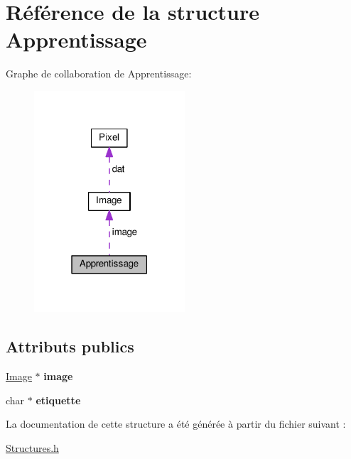 \hypertarget{structApprentissage}{}\section{Référence de la structure Apprentissage}
\label{structApprentissage}


Graphe de collaboration de Apprentissage\+:
\nopagebreak
\begin{figure}[H]
\begin{center}
\leavevmode
\includegraphics[width=159pt]{structApprentissage__coll__graph}
\end{center}
\end{figure}
\subsection*{Attributs publics}
\begin{DoxyCompactItemize}
\item 
\hyperlink{structImage}{Image} $\ast$ {\bfseries image}\hypertarget{structApprentissage_af3defb9d6e44f5ca0fe145113cec1943}{}\label{structApprentissage_af3defb9d6e44f5ca0fe145113cec1943}

\item 
char $\ast$ {\bfseries etiquette}\hypertarget{structApprentissage_af1668167b1678d621bb9b88573f55be7}{}\label{structApprentissage_af1668167b1678d621bb9b88573f55be7}

\end{DoxyCompactItemize}


La documentation de cette structure a été générée à partir du fichier suivant \+:\begin{DoxyCompactItemize}
\item 
\hyperlink{Structures_8h}{Structures.\+h}\end{DoxyCompactItemize}
